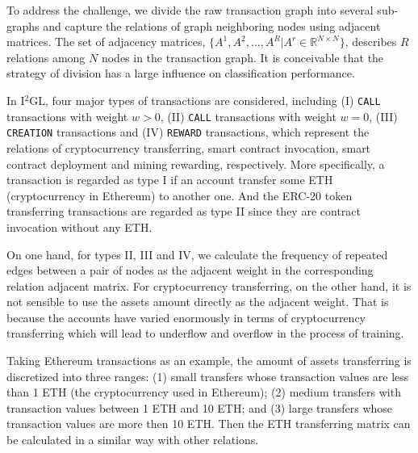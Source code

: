 To address the challenge, we divide the raw transaction graph into several sub-graphs and capture the relations of graph neighboring nodes using adjacent matrices. The set of adjacency matrices, $\{A^1,A^2,\dots,A^R|A^r\in \mathbb{R}^{N \times N}\}$, describes $R$ relations among $N$ nodes in the transaction graph. It is conceivable that the strategy of division has a large influence on classification performance.

In I$^2$GL, four major types of transactions are considered, including (I) \texttt{CALL} transactions with weight $w>0$, (II) \texttt{CALL} transactions with weight $w=0$, (III) \texttt{CREATION} transactions and (IV) \texttt{REWARD} transactions, which represent the relations of cryptocurrency transferring, smart contract invocation, smart contract deployment and mining rewarding, respectively. More specifically, a transaction is regarded as type I if an account transfer some ETH (cryptocurrency in Ethereum) to another one. And the ERC-20 token transferring transactions are regarded as type II since they are contract invocation without any ETH.

On one hand, for types II, III and IV, we calculate the frequency of repeated edges between a pair of nodes as the adjacent weight in the corresponding relation adjacent matrix. For cryptocurrency transferring, on the other hand, it is not sensible to use the assets amount directly as the adjacent weight. That is because the accounts have varied enormously in terms of cryptocurrency transferring which will lead to underflow and overflow in the process of training.

 Taking Ethereum transactions as an example, the amount of assets transferring is discretized into three ranges: (1) small transfers whose transaction values are less than 1 ETH (the cryptocurrency used in Ethereum); (2) medium transfers with transaction values between 1 ETH and 10 ETH; and (3) large transfers whose transaction values are more then 10 ETH. Then the ETH transferring matrix can be calculated in a similar way with other relations.



